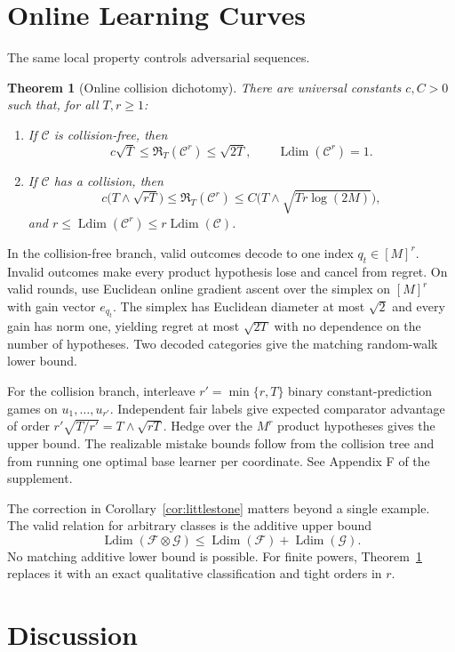 \documentclass[twoside]{article}
\newtheorem{theorem}{Theorem}
\newcommand{\C}{\mathcal C}
\newcommand{\Ldim}{\operatorname{Ldim}}
\newcommand{\Risk}{\mathfrak R}
\begin{document}
\section{Online Learning Curves}
\label{sec:online}

The same local property controls adversarial sequences.

\begin{theorem}[Online collision dichotomy]
\label{thm:online}
There are universal constants $c,C>0$ such that, for all $T,r\geq1$:
\begin{enumerate}
\item If $\C$ is collision-free, then
\[
 c\sqrt T\leq\Risk_T(\C^r)\leq\sqrt{2T},
 \qquad \Ldim(\C^r)=1.
\]
\item If $\C$ has a collision, then
\[
 c\bigl(T\wedge\sqrt{rT}\bigr)
 \leq\Risk_T(\C^r)
 \leq C\bigl(T\wedge\sqrt{Tr\log(2M)}\bigr),
\]
and $r\leq\Ldim(\C^r)\leq r\Ldim(\C)$.
\end{enumerate}
\end{theorem}

In the collision-free branch, valid outcomes decode to one index $q_t\in[M]^r$. Invalid outcomes make every product hypothesis lose and cancel from regret. On valid rounds, use Euclidean online gradient ascent over the simplex on $[M]^r$ with gain vector $e_{q_t}$. The simplex has Euclidean diameter at most $\sqrt2$ and every gain has norm one, yielding regret at most $\sqrt{2T}$ with no dependence on the number of hypotheses. Two decoded categories give the matching random-walk lower bound.

For the collision branch, interleave $r'=\min\{r,T\}$ binary constant-prediction games on $u_1,\ldots,u_{r'}$. Independent fair labels give expected comparator advantage of order $r'\sqrt{T/r'}=T\wedge\sqrt{rT}$. Hedge over the $M^r$ product hypotheses gives the upper bound. The realizable mistake bounds follow from the collision tree and from running one optimal base learner per coordinate. See Appendix F of the supplement.

The correction in Corollary~\ref{cor:littlestone} matters beyond a single example. The valid relation for arbitrary classes is the additive upper bound
\[
 \Ldim(\mathcal F\otimes\mathcal G)\leq\Ldim(\mathcal F)+\Ldim(\mathcal G).
\]
No matching additive lower bound is possible. For finite powers, Theorem~\ref{thm:online} replaces it with an exact qualitative classification and tight orders in $r$.

\section{Discussion}
\end{document}
